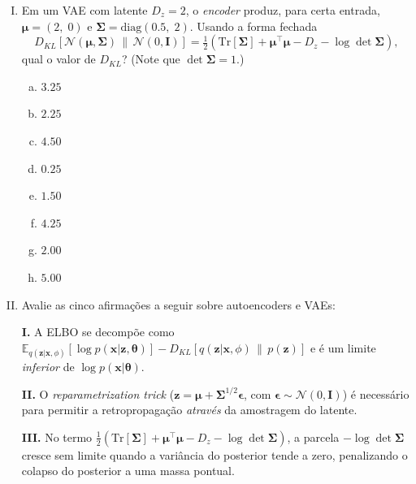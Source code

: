 \documentclass{dlproblemset}
\newcommand{\thetav}{\boldsymbol{\theta}}
\begin{document}
\begin{enumerate}[I)]
    \item Em um VAE com latente $D_z = 2$, o \textit{encoder} produz, para certa entrada, $\boldsymbol{\mu} = (2,\; 0)$ e $\boldsymbol{\Sigma} = \mathrm{diag}(0.5,\; 2)$. Usando a forma fechada
    \[
      D_{KL}\!\left[\mathcal{N}(\boldsymbol{\mu},\boldsymbol{\Sigma})\,\|\,\mathcal{N}(0,\mathbf{I})\right] = \tfrac{1}{2}\!\left(\mathrm{Tr}[\boldsymbol{\Sigma}] + \boldsymbol{\mu}^{\top}\boldsymbol{\mu} - D_z - \log\det\boldsymbol{\Sigma}\right),
    \]
    qual o valor de $D_{KL}$? (Note que $\det\boldsymbol{\Sigma} = 1$.)
    \begin{enumerate}[(a)]
        \item $3.25$
        \item $2.25$
        \item $4.50$
        \item $0.25$
        \item $1.50$
        \item $4.25$
        \item $2.00$
        \item $5.00$
    \end{enumerate}

    \item Avalie as cinco afirmações a seguir sobre autoencoders e VAEs:

    \textbf{I.} A ELBO se decompõe como $\mathbb{E}_{q(\mathbf{z}|\mathbf{x},\phi)}[\log p(\mathbf{x}|\mathbf{z},\thetav)] - D_{KL}[q(\mathbf{z}|\mathbf{x},\phi)\,\|\,p(\mathbf{z})]$ e é um limite \emph{inferior} de $\log p(\mathbf{x}|\thetav)$.

    \textbf{II.} O \textit{reparametrization trick} ($\mathbf{z} = \boldsymbol{\mu} + \boldsymbol{\Sigma}^{1/2}\boldsymbol{\epsilon}$, com $\boldsymbol{\epsilon} \sim \mathcal{N}(0,\mathbf{I})$) é necessário para permitir a retropropagação \emph{através} da amostragem do latente.

    \textbf{III.} No termo $\tfrac{1}{2}(\mathrm{Tr}[\boldsymbol{\Sigma}] + \boldsymbol{\mu}^{\top}\boldsymbol{\mu} - D_z - \log\det\boldsymbol{\Sigma})$, a parcela $-\log\det\boldsymbol{\Sigma}$ cresce sem limite quando a variância do posterior tende a zero, penalizando o colapso do posterior a uma massa pontual.


\end{enumerate}
\end{document}
